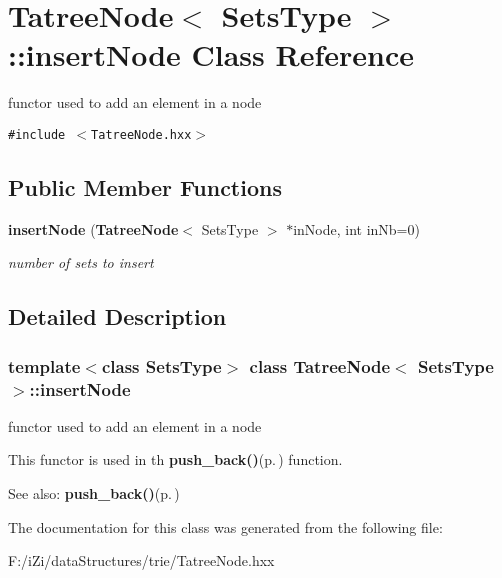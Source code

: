 \section{Tatree\-Node$<$ Sets\-Type $>$::insert\-Node Class Reference}
\label{class_tatree_node_1_1insert_node}
functor used to add an element in a node  


{\tt \#include $<$Tatree\-Node.hxx$>$}

\subsection*{Public Member Functions}
\begin{CompactItemize}
\item 
{\bf insert\-Node} ({\bf Tatree\-Node}$<$ Sets\-Type $>$ $\ast$in\-Node, int in\-Nb=0)\label{class_tatree_node_1_1insert_node_dc6f2d230c41ebca07df5988eb9c53b3}

\begin{CompactList}\small\item\em number of sets to insert \item\end{CompactList}\end{CompactItemize}


\subsection{Detailed Description}
\subsubsection*{template$<$class Sets\-Type$>$ class Tatree\-Node$<$ Sets\-Type $>$::insert\-Node}

functor used to add an element in a node 

This functor is used in th {\bf push\_\-back()}{\rm (p.\,\pageref{class_tatree_node_b8ab38f4a513579212225b8a5bf647f9})} function. \begin{Desc}
\item[See also:]{\bf push\_\-back()}{\rm (p.\,\pageref{class_tatree_node_b8ab38f4a513579212225b8a5bf647f9})} \end{Desc}




The documentation for this class was generated from the following file:\begin{CompactItemize}
\item 
F:/i\-Zi/data\-Structures/trie/Tatree\-Node.hxx\end{CompactItemize}
